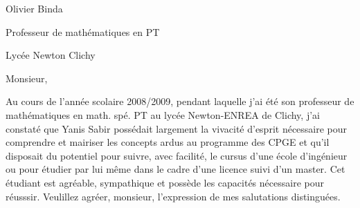 \let\LMTone\relax


%

\noindent
Olivier Binda

\noindent
Professeur de mathématiques en PT

\noindent
Lycée Newton Clichy
\vfill
\bigskip
\bigskip
\centerline{Monsieur, }
\bigskip
\bigskip

Au cours de l'année scolaire 2008/2009, pendant laquelle j'ai été son professeur de mathématiques en math. spé. PT au lycée Newton-ENREA de Clichy, 
j'ai constaté que Yanis Sabir possédait largement la vivacité d'esprit nécessaire pour comprendre et mairiser les concepts ardus au programme des CPGE et qu'il disposait du potentiel pour suivre, avec facilité, le cursus d'une école d'ingénieur ou pour étudier par lui m\^eme dans le cadre d'une licence suivi d'un master. 
\bigskip
Cet étudiant est  agréable, sympathique et possède les capacités nécessaire pour réusssir. 
\bigskip
\bigskip
Veulillez agréer, monsieur, l'expression de mes salutations distinguées. 
\vfill\vfill\vfill\vfill
\null\eject

\bye
